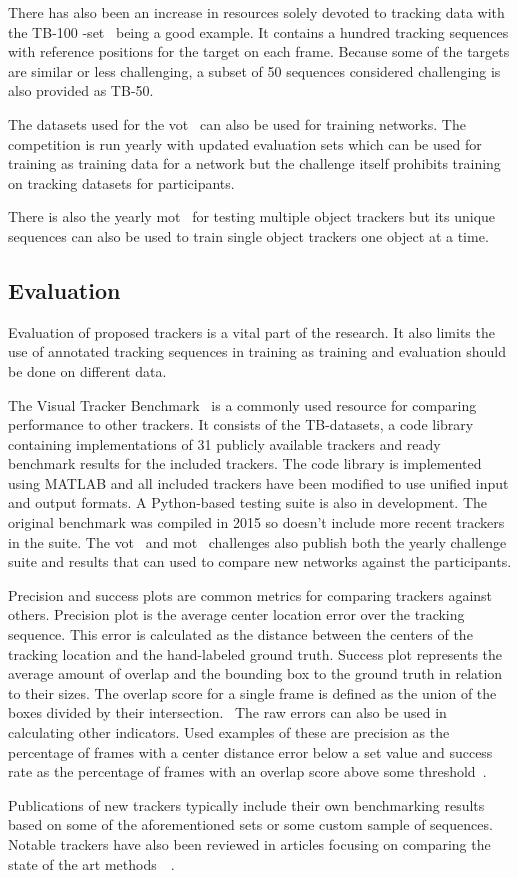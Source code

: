 There has also been an increase in resources solely devoted to tracking data with the
TB-100 -set~\cite{VTB} being a good example. It contains a hundred tracking sequences
with reference positions for the target on each frame. Because some of the targets are
similar or less challenging, a subset of 50 sequences considered challenging is also
provided as TB-50.~\cite{OT_BENCH}

The datasets used for the \ac{vot}~\cite{VOT} can also be used for training networks. The
competition is run yearly with updated evaluation sets which can be used for training as
training data for a network but the challenge itself prohibits training on tracking datasets
for participants.

There is also the yearly \ac{mot}~\cite{MOT16} for testing multiple object trackers but
its unique sequences can also be used to train single object trackers one object at a
time.

\subsection{Evaluation}
Evaluation of proposed trackers is a vital part of the research. It also limits the use
of annotated tracking sequences in training as training and evaluation should be done
on different data.

The Visual Tracker Benchmark~\cite{VTB} is a commonly used resource for comparing
performance to other trackers. It consists of the TB-datasets, a code library containing
implementations of 31 publicly available trackers and ready benchmark results for the
included trackers. The code library is implemented using MATLAB and all included trackers
have been modified to use unified input and output formats. A Python-based testing suite
is also in development. The original benchmark was compiled in 2015 so doesn't include
more recent trackers in the suite. The \ac{vot}~\cite{VOT} and \ac{mot}~\cite{MOT16}
challenges also publish both the yearly challenge suite and results that can used to
compare new networks against the participants.

Precision and success plots are common metrics for comparing trackers against others.
Precision plot is the average center location error over the tracking sequence. This
error is calculated as the distance between the centers of the tracking location and
the hand-labeled ground truth. Success plot represents the average amount of overlap
and the bounding box to the ground truth in relation to their sizes. The overlap score
for a single frame is defined as the union of the boxes divided by their intersection.~\cite{OT_BENCH}
The raw errors can also be used in calculating other indicators. Used examples of these
are precision as the percentage of frames with a center distance error below a set value
and success rate as the percentage of frames with an overlap score above some threshold~\cite{DEEPTRACK}.

Publications of new trackers typically include their own benchmarking results based
on some of the aforementioned sets or some custom sample of sequences. Notable trackers
have also been reviewed in articles focusing on comparing the state of the art
methods~\cite{OT_BENCH}~\cite{VOT}.
